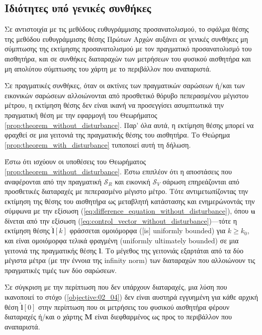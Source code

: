 \subsection{Ιδιότητες υπό γενικές συνθήκες}
\label{subsection:02_04_03:02}

Σε αντιστοιχία με τις μεθόδους ευθυγράμμισης προσανατολισμού, το σφάλμα θέσης
της μεθόδου ευθυγράμμισης θέσης Πρώτων Αρχών αυξάνει σε γενικές συνθήκες μη
σύμπτωσης της εκτίμησης προσανατολισμού με τον πραγματικό προσανατολισμό του
αισθητήρα, και σε συνθήκες διαταραχών των μετρήσεων του φυσικού αισθητήρα και
μη απολύτου σύμπτωσης του χάρτη με το περιβάλλον που αναπαριστά.

Σε πραγματικές συνθήκες, όταν οι ακτίνες των πραγματικών σαρώσεων ή/και των
εικονικών σαρώσεων αλλοιώνονται από προσθετικό θόρυβο πεπερασμένου μέγιστου
μέτρου, η εκτίμηση θέσης δεν είναι ικανή να προσεγγίσει ασυμπτωτικά την
πραγματική θέση με την εφαρμογή του Θεωρήματος
\ref{prop:theorem_without_disturbance}. Παρ' όλα αυτά, η εκτίμηση θέσης μπορεί
να φραχθεί σε μια γειτονιά της πραγματικής θέσης του αισθητήρα. Το Θεώρημα
\ref{prop:theorem_with_disturbance} τυποποιεί αυτή τη δήλωση.

\begin{bw_box}
\begin{theorem}
  \label{prop:theorem_with_disturbance}
  Έστω ότι ισχύουν οι υποθέσεις του Θεωρήματος
  \ref{prop:theorem_without_disturbance}. Έστω επιπλέον ότι η αποστάσεις που
  αναφέρονται από την πραγματική $\mathcal{S}_R$ και εικονική $\mathcal{S}_V$
  σάρωση επηρεάζονται από προσθετικές διαταραχές με πεπερασμένο μέγιστο μέτρο.
  Τότε αντιμετωπίζοντας την εκτίμηση της θέσης του αισθητήρα ως μεταβλητή
  κατάστασης και ενημερώνοντάς την σύμφωνα με την εξίσωση
  (\ref{eq:difference_equation_without_disturbance}), όπου $\bm{u}$ δίνεται
  από την εξίσωση (\ref{eq:control_vector_without_disturbance})---τότε
  η εκτίμηση θέσης $\hat{\bm{l}}[k]$ φράσσεται ομοιόμορφα ([is] uniformly
  bounded) για $k \geq k_0$, και είναι ομοιόμορφα τελικά φραγμένη (uniformly
  ultimately bounded) σε μια γειτονιά της πραγματικής θέσης $\bm{l}$. Το
  μέγεθος της γειτονιάς εξαρτάται από τα δύο μέγιστα μέτρα (με την έννοια της
  infinity norm) των διαταραχών που αλλοιώνουν τις πραγματικές τιμές των δύο
  σαρώσεων.
\end{theorem}
\end{bw_box}

\begin{corollary}
  Σε σύγκριση με την περίπτωση που δεν υπάρχουν διαταραχές, μια λύση που
  ικανοποιεί το στόχο (\ref{objective:02_04}) δεν είναι αυστηρά εγγυημένη για
  κάθε αρχική θέση $\hat{\bm{l}}[0]$ στην περίπτωση που οι μετρήσεις του φυσικού
  αισθητήρα φέρουν διαταραχές ή/και ο χάρτης $\bm{M}$ είναι διεφθαρμένος ως προς
  το περιβάλλον που αναπαριστά.
\end{corollary}

